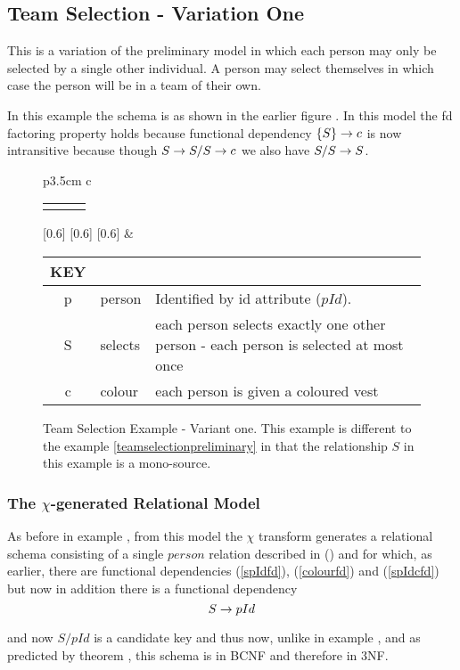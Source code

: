 \subsection{Team Selection - Variation One}
This is a variation of the preliminary model in which each person may only be selected by a single other individual.
A person may select themselves in which case the person will be in a team of their own. 

In this example the schema is as shown in the earlier figure . 
In this model the fd factoring property holds because functional dependency $\left\{S\right\} \rightarrow c$ is now intransitive because though
$S \rightarrow S/S \rightarrow c$ we also have $S/S \rightarrow S$.

\begin{figure} [h]
\begin{center}
\begin{tabular}{p{3.5cm} c}
\begin{tabular}{c p{1.5cm} c}
   \Rnode{p}{p} & & \Rnode{v}{v}
\end{tabular}
[0.6]
[0.6]
[0.6]
\idcomp
& \footnotesize
\begin{tabular}{c p{1.5cm} p{4cm}}
KEY && \\
\hline
p & person & Identified by id attribute ($pId$). \\
S & selects & each person selects exactly one other person - each person is selected at most once \\
c & colour & each person is given a coloured vest 
\end{tabular} 
\end{tabular}
\end{center}
\caption{Team Selection Example  - Variant one. This example is different to the example \ref{teamselectionpreliminary} in that the relationship $S$ in this example is a mono-source. 
}
\label{teamselectionvariantoneERschema}
\end{figure}

\subsubsection{The $\chi$-generated Relational Model}
As before in example , from this model the $\chi$ transform generates  a relational schema  consisting of a single
$person$ relation described in () and for which, as earlier, there are functional dependencies (\ref{spIdfd}),
(\ref{colourfd}) and (\ref{spIdcfd}) but now in addition
there is a functional dependency 
\begin{equation}
S \rightarrow pId
\end{equation}

and now $S/pId$ is a candidate key and thus now, unlike in example , and as predicted by 
theorem , this schema is in BCNF and therefore in 3NF. 
